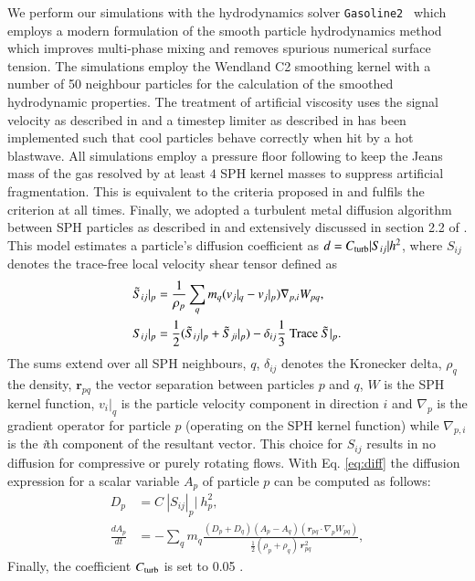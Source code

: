 \documentclass{aa}
\newcommand{\G}{\texttt{Gasoline2}}
\begin{document}
We perform our simulations with the hydrodynamics solver \G\ \citep{Wadsley2017} which employs a modern formulation of the smooth particle hydrodynamics method which improves multi-phase mixing and removes spurious numerical surface tension. The simulations employ the Wendland C2 smoothing kernel \citep{Dehnen2012} with a number of 50 neighbour particles for the calculation of the smoothed hydrodynamic properties. The treatment of artificial viscosity uses the signal velocity as described in \cite{Price2008} and a timestep limiter as  described in \cite{Saitoh2009} has been implemented such that cool particles behave correctly when hit by a hot blastwave. All simulations employ a pressure floor following \citet{Agertz2009} to keep the Jeans mass of the gas resolved by at least $4$ SPH kernel masses to suppress artificial fragmentation. This is equivalent to the criteria proposed in \citet{Richings2016} and fulfils the \citet{Truelove1997} criterion at all times. Finally, we adopted a turbulent metal diffusion algorithm between SPH particles as described in \cite{Wadsley2008} and extensively discussed in section 2.2  of \citet{Shen2010}.  
This model estimates a particle's diffusion coefficient as $d = C_{\rm turb}\vert S_{ij}\vert h^2$, where $S_{ij}$ denotes the trace-free local velocity shear tensor defined as 
\begin{align}
\tilde{S}_{ij}|_p &= \frac{1}{\rho_p}\sum_q m_q (v_j|_q-v_j|_p)
\nabla_{p,i} W_{pq}, \nonumber \\ 
S_{ij}|_p &= \frac{1}{2}(\tilde{S}_{ij}|_p+\tilde{S}_{ji}|_p) - \delta_{ij} \frac{1}{3}\ {\rm Trace}\ \tilde{S}|_p.
\label{eq:diff}
\end{align}
The sums extend over all SPH neighbours, $q$, $\delta_{ij}$ denotes the Kronecker delta, $\rho_q$ the density, $\mathbf{r}_{pq}$ the vector separation between particles $p$ and $q$, $W$ is the SPH kernel function, $v_i|_q$ is the particle velocity component in direction $i$ and $\nabla_p$ is the gradient operator for particle $p$ (operating on the SPH kernel function) while $\nabla_{p,i}$ is the {\it i}th component of the resultant vector. This choice for $S_{ij}$ results in no diffusion for compressive or purely rotating flows. 
With Eq. \ref{eq:diff} the diffusion expression for a scalar variable $A_p$ of particle $p$ can be computed as follows:
\begin{align}
D_p &= C\ |S_{ij}|_p|\ h_p^2,\nonumber \\
\frac{dA_p}{dt} &= -\sum_q m_q \frac{(D_p+D_q)(A_p-A_q)(\mathbfit{r}_{pq}\cdot\nabla_p W_{pq})}{\frac{1}{2}(\rho_p+\rho_q)\,\mathbfit{r}_{pq}^2},
\end{align}
Finally, the coefficient $C_{\rm turb}$ is set to 0.05 \citep{Wadsley2008,Shen2010}.
\end{document}
